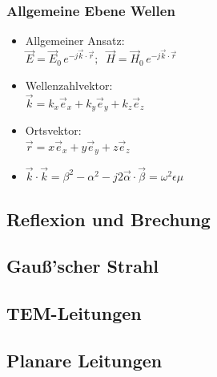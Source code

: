 {	 \subsubsection{Allgemeine Ebene Wellen}
	 \begin{itemize}
	 	\itemsep0pt
		\item Allgemeiner Ansatz:\\
		\(\vec{E} = \vec{E}_0\,e^{-j\vec{k}\cdot\vec{r}};\;\;\vec{H} = \vec{H}_0\,e^{-j\vec{k}\cdot\vec{r}}\)
		\item Wellenzahlvektor:\\
		\(\vec{k} = k_x\vec{e}_x + k_y\vec{e}_y + k_z\vec{e}_z\)
		\item Ortsvektor:\\
		\(\vec{r} = x\vec{e}_x + y\vec{e}_y + z\vec{e}_z\)
		\item \(\vec{k}\cdot\vec{k} = \beta^2 - \alpha^2 - j2\vec{\alpha}\cdot\vec{\beta} = \omega^2\epsilon\mu\)
	 \end{itemize}
	 }

	 \subsection{Reflexion und Brechung}
	 \subsection{Gauß'scher Strahl}
	 \subsection{TEM-Leitungen}
	 \subsection{Planare Leitungen}
